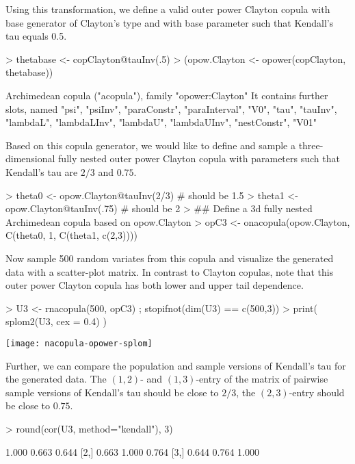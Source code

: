 \documentclass[nojss,article]{jss}
\theoremstyle{mythmstyle}
\begin{document}
Using this transformation, we define a valid outer power Clayton copula with
base generator of Clayton's type and with base parameter such that Kendall's tau
equals 0.5.
\begin{Schunk}
\begin{Sinput}
> thetabase <- copClayton@tauInv(.5)
> (opow.Clayton <- opower(copClayton, thetabase))
\end{Sinput}
\begin{Soutput}
Archimedean copula ("acopula"), family "opower:Clayton"
 It contains further slots, named
  "psi", "psiInv", "paraConstr", "paraInterval", "V0", "tau",
  "tauInv", "lambdaL", "lambdaLInv", "lambdaU", "lambdaUInv",
  "nestConstr", "V01"
\end{Soutput}
\end{Schunk}

Based on this copula generator, we would like to define and sample a
three-dimensional fully nested outer power Clayton copula with parameters
such that Kendall's tau are $2/3$ and $0.75$.
\begin{Schunk}
\begin{Sinput}
> theta0 <- opow.Clayton@tauInv(2/3) # should be 1.5
> theta1 <- opow.Clayton@tauInv(.75) # should be 2
> ## Define a 3d fully nested Archimedean copula based on  opow.Clayton
> opC3 <- onacopula(opow.Clayton, C(theta0, 1, C(theta1, c(2,3))))
\end{Sinput}
\end{Schunk}

Now sample 500 random variates from this copula and visualize the generated
data with a scatter-plot matrix. In contrast to Clayton copulas, note that
this outer power Clayton copula has both lower and upper tail dependence.
\begin{Schunk}
\begin{Sinput}
> U3 <- rnacopula(500, opC3) ; stopifnot(dim(U3) == c(500,3))
> print( splom2(U3, cex = 0.4) )
\end{Sinput}
\end{Schunk}
\texttt{[image: nacopula-opower-splom]}

Further, we can compare the population and sample versions of Kendall's tau for
the generated data. The $(1,2)$- and $(1,3)$-entry of the matrix of
pairwise sample versions of Kendall's tau should be close to $2/3$, the
$(2,3)$-entry should be close to $0.75$.
\begin{Schunk}
\begin{Sinput}
> round(cor(U3, method="kendall"), 3)
\end{Sinput}
\begin{Soutput}
      [,1]  [,2]  [,3]
[1,] 1.000 0.663 0.644
[2,] 0.663 1.000 0.764
[3,] 0.644 0.764 1.000
\end{Soutput}
\end{Schunk}
\end{document}
